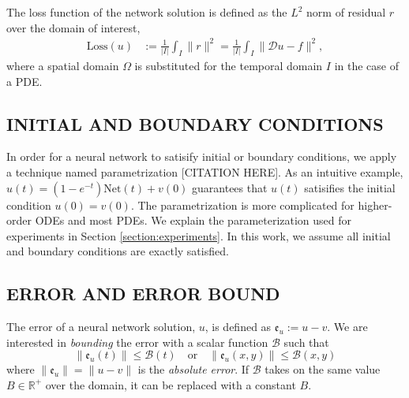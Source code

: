\documentclass[accepted]{uai2023}
\newcommand{\Err}{\mathfrak{e}}
\newcommand{\Bound}{\mathcal{B}}
\newcommand{\Loss}{\mathrm{Loss}}
\newcommand{\Net}{\mathrm{Net}}
\begin{document}
    The loss function of the network solution is defined as the $L^2$ norm of residual $r$ over the domain of interest,
    {
        \small
        \begin{align}
            \Loss{}(u) &:= \frac{1}{|I|} \int_{I} \|r\|^2 = \frac{1}{|I|} \int_{I} \|\mathcal{D} u - f\|^2,
        \end{align}
    }
    where a spatial domain $\Omega$ is substituted for the temporal domain $I$ in the case of a PDE.

\subsection{INITIAL AND BOUNDARY CONDITIONS}\label{section:initial-and-boundary-conditions}
    In order for a neural network to satisify initial or boundary conditions, we apply a technique named parametrization [CITATION HERE]. 
    As an intuitive example, $u(t) = (1 - e^{-t}) \Net(t) + v(0)$ guarantees that $u(t)$ satisifies the initial condition $u(0)=v(0)$. 
    The parametrization is more complicated for higher-order ODEs and most PDEs. 
    We explain the parameterization used for experiments in Section \ref{section:experiments}. 
    In this work, we assume all initial and boundary conditions are exactly satisfied.

\subsection{ERROR AND ERROR BOUND}
    The error of a neural network solution, $u$, is defined as $ \Err_u := u - v$.
    We are interested in \textit{bounding} the error with a scalar function $\Bound$ such that
    {
        \small
        \begin{equation}
            \|\Err_u(t)\| \leq \Bound(t) \quad\text{or}\quad \|\Err_{u}(x, y)\| \leq \Bound(x, y)
        \end{equation}
    }
    where $\|\Err_u\| = \|u - v\|$ is the \textit{absolute error}.
    If $\Bound$ takes on the same value $B \in \mathbb{R}^{+}$ over the domain, it can be replaced with a constant $B$.
\end{document}

